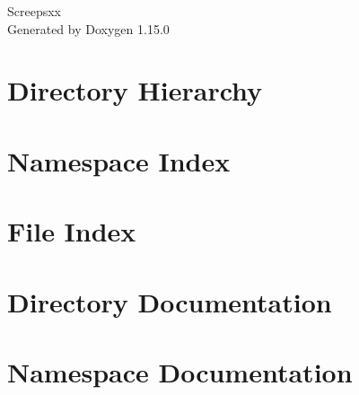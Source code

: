 \documentclass[twoside]{book}
\newcommand{\+}{\discretionary{\mbox{\scriptsize$\hookleftarrow$}}{}{}}
\newcommand{\clearemptydoublepage}{%
    \newpage{\pagestyle{empty}\cleardoublepage}%
  }
\begin{document}
  \raggedbottom
    \hypersetup{pageanchor=false,
                bookmarksnumbered=true,
                pdfencoding=unicode
               }
  \begin{titlepage}
  \vspace*{7cm}
  \begin{center}%
  {\Large Screepsxx}\\
  \vspace*{1cm}
  {\large Generated by Doxygen 1.15.0}\\
  \end{center}
  \end{titlepage}
  \clearemptydoublepage
  \tableofcontents
  \clearemptydoublepage
  \hypersetup{pageanchor=true}
\chapter{Directory Hierarchy}

\chapter{Namespace Index}

\chapter{File Index}

\chapter{Directory Documentation}

\chapter{Namespace Documentation}


\end{document}
